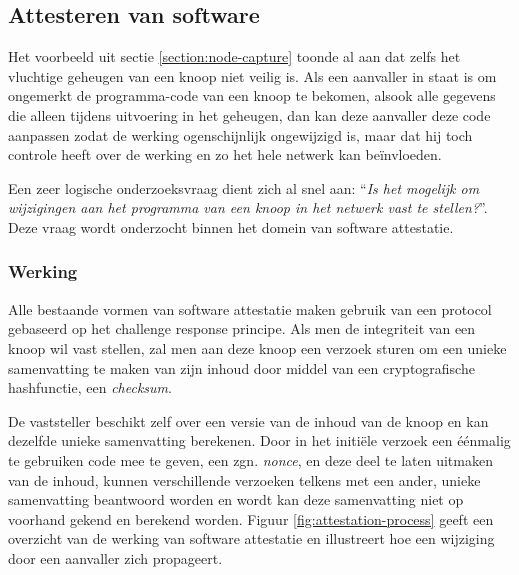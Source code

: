 
\subsection{Attesteren van software}
\label{subsection:attestation}

Het voorbeeld uit sectie \ref{section:node-capture} toonde al aan dat zelfs het
vluchtige geheugen van een knoop niet veilig is. Als een aanvaller in staat is
om ongemerkt de programma-code van een knoop te bekomen, alsook alle gegevens
die alleen tijdens uitvoering in het geheugen, dan kan deze aanvaller deze code
aanpassen zodat de werking ogenschijnlijk ongewijzigd is, maar dat hij toch
controle heeft over de werking en zo het hele netwerk kan be\"invloeden.

Een zeer logische onderzoeksvraag dient zich al snel aan: ``\emph{Is het
mogelijk om wijzigingen aan het programma van een knoop in het netwerk vast te
stellen?}''. Deze vraag wordt onderzocht binnen het domein van software
attestatie.

\subsubsection*{Werking}

Alle bestaande vormen van software attestatie maken gebruik van een protocol
gebaseerd op het challenge response principe. Als men de integriteit van een
knoop wil vast stellen, zal men aan deze knoop een verzoek sturen om een unieke
samenvatting te maken van zijn inhoud door middel van een cryptografische
hashfunctie, een \emph{checksum}.

De vaststeller beschikt zelf over een versie van de inhoud van de knoop en kan
dezelfde unieke samenvatting berekenen. Door in het initi\"ele verzoek een
\'e\'enmalig te gebruiken code mee te geven, een zgn. \emph{nonce}, en deze
deel te laten uitmaken van de inhoud, kunnen verschillende verzoeken telkens
met een ander, unieke samenvatting beantwoord worden en wordt kan deze
samenvatting niet op voorhand gekend en berekend worden. Figuur
\ref{fig:attestation-process} geeft een overzicht van de werking van software
attestatie en illustreert hoe een wijziging door een aanvaller zich propageert.

